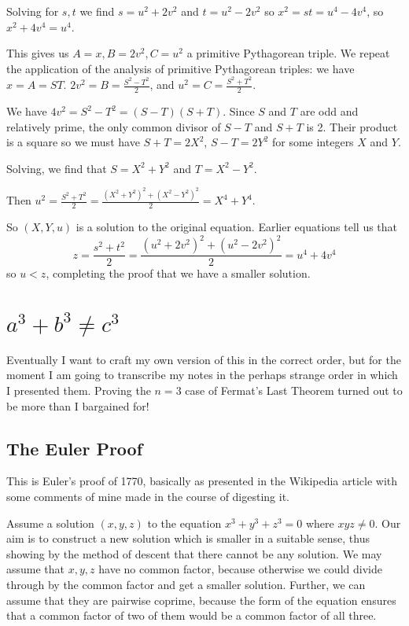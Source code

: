 \documentclass[12pt]{article}
\begin{document}
Solving for $s,t$ we find $s=u^2+2v^2$ and $t=u^2-2v^2$ so $x^2=st=u^4-4v^4$, so $x^2+4v^4=u^4$.

This gives us $A=x, B=2v^2, C=u^2$ a primitive Pythagorean triple.  We repeat the application of the analysis of primitive Pythagorean triples:
we have $x=A=ST$. $2v^2=B=\frac{S^2-T^2}2$, and $u^2=C=\frac{S^2+T^2}2$.

We have $4v^2=S^2-T^2=(S-T)(S+T)$.   Since $S$ and $T$ are odd and relatively prime, the only common divisor of $S-T$ and $S+T$ is 2.
Their product is a square so we must have $S+T=2X^2$, $S-T=2Y^2$ for some integers $X$ and $Y$.

Solving, we find that $S=X^2+Y^2$ and $T=X^2-Y^2$.

Then $u^2 = \frac{S^2+T^2}2 = \frac{(X^2+Y^2)^2+(X^2-Y^2)^2}2=X^4+Y^4$.

So $(X,Y,u)$ is a solution to the original equation.  Earlier equations tell us that $$z=\frac{s^2+t^2}2=\frac{(u^2+2v^2)^2+(u^2-2v^2)^2}2=u^4+4v^4$$ so $u<z$, completing the proof that we have a smaller solution.



\newpage

\section{$a^3 + b^3 \neq c^3$}

Eventually I want to craft my own version of this in the correct order, but for the moment I am going to transcribe my notes in the perhaps strange order in which I presented them.   Proving the $n=3$ case of Fermat's Last Theorem turned out to be more than I bargained for!

\subsection{The Euler Proof}

This is Euler's proof of 1770, basically  as presented in the Wikipedia article with some comments of mine made in the course of digesting it.

Assume a solution $(x,y,z)$  to the equation $x^3+y^3+z^3=0$ where $xyz \neq 0$.  Our aim is to construct a new solution which is smaller in a suitable sense, thus showing by the method of descent that there cannot be any solution. We may assume that $x,y,z$ have no common factor, because otherwise we could divide through by the common factor and get a smaller solution.   Further, we can assume that they are pairwise coprime, because the form of the equation ensures that a common factor of two of them would be a common factor of all three.  
\end{document}
